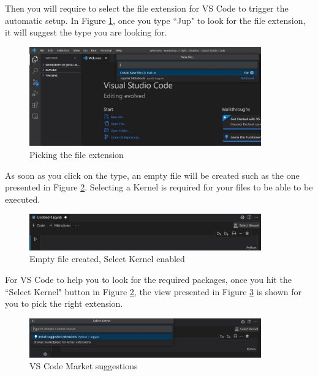 \documentclass{assignment}
\begin{document}
Then you will require to select the file extension for VS Code to trigger the automatic setup. In Figure \ref{fig:new_file_1}, once you type ``Jup" to look for the file extension, it will suggest the type you are looking for.

\begin{figure}[h]
 \centering 
    \includegraphics[width=10cm]{assets/vs_code_jupyter_notebook.JPG}
    \caption{Picking the file extension}
    \label{fig:new_file_1}
\end{figure}

As soon as you click on the type, an empty file will be created such as the one presented in Figure \ref{fig:new_file_2}. Selecting a Kernel is required for your files to be able to be executed.

\begin{figure}[h]
 \centering 
    \includegraphics[width=10cm]{assets/vs_code_select_kernel.JPG}
    \caption{Empty file created, Select Kernel enabled}
    \label{fig:new_file_2}
\end{figure}

For VS Code to help you to look for the required packages, once you hit the ``Select Kernel" button in Figure \ref{fig:new_file_2}, the view presented in Figure \ref{fig:new_file_3} is shown for you to pick the right extension.

\begin{figure}[h]
 \centering 
    \includegraphics[width=10cm]{assets/vs_code_suggested_extensions.JPG}
    \caption{VS Code Market suggestions}
    \label{fig:new_file_3}
\end{figure}

\newpage
\end{document}
